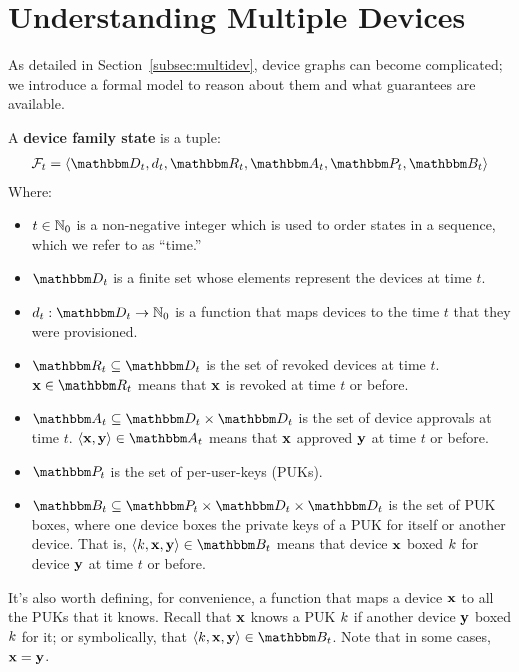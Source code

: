 \section{Understanding Multiple Devices}
\label{appendix:multidev}

As detailed in Section~\ref{subsec:multidev}, device graphs can become complicated; we introduce a
formal model to reason about them and what guarantees are available.

\begin{definition}
A \textbf{device family state} is a tuple: 
\begin{gather*}
\zfam_t = \langle \zset{d}_t, \zdevtime_t, \zset{r}_t, \zset{a}_t, \zset{p}_t, \zset{b}_t \rangle
\end{gather*}
Where:
\begin{itemize}
\item $t \in \mathbb{N}_0$ is a non-negative integer which is used to order states in a sequence,
which we refer to as ``time.''
\item $\zset{d}_t$ is a finite set whose elements represent the devices at time $t$.
\item $\zdevtime_t : \zset{d}_t \rightarrow \integers_0$ is a function that maps devices to the time
$t$ that they were provisioned.
\item $\zset{r}_t \subseteq \zset{d}_t$ is the set of revoked devices at time $t$. $\zdev{x} \in
\zset{r}_t$ means that $\mathbf{x}$ is revoked at time $t$ or before.
\item $\zset{a}_t \subseteq \zset{d}_t \times \zset{d}_t$ is the set of device approvals at time
$t$. $\langle \zdev{x}, \zdev{y} \rangle \in \zset{a}_t$ means that $\mathbf{x}$ approved $\mathbf{y}$
at time $t$ or before.
\item $\zset{p}_t$ is the set of per-user-keys (PUKs).
\item $\zset{b}_t \subseteq \zset{p}_t \times \zset{d}_t \times \zset{d}_t$ is the set of PUK boxes,
where one device boxes the private keys of a PUK for itself or another device. That is, $\langle
\zkey{k}, \zdev{x}, \zdev{y} \rangle \in \zset{b}_t$ means that device $\mathbf{x}$ boxed ${k}$
for device $\mathbf{y}$ at time $t$ or before.
\end{itemize}
\end{definition}

It's also worth defining, for convenience, a function that maps a device $\mathbf{x}$ to all the PUKs
that it knows. Recall that $\mathbf{x}$ knows a PUK ${k}$ if another device $\mathbf{y}$ boxed
${k}$ for it; or symbolically, that $\langle \zkey{k}, \zdev{x}, \zdev{y} \rangle \in
\zset{b}_t$. Note that in some cases, $\mathbf{x} = \mathbf{y}$. 

